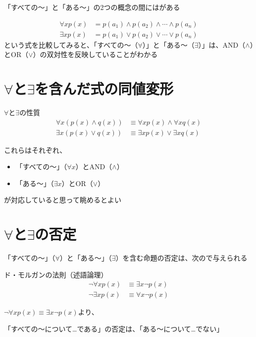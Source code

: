 \documentclass[b5paper,12pt]{jsarticle}
\begin{document}
「すべての〜」と「ある〜」の2つの概念の間にはがある

\begin{align*}
  \forall x p(x) & = p(a_1) \land p(a_2) \land \cdots \land p(a_n) \\
  \exists x p(x) & = p(a_1) \lor p(a_2) \lor \cdots \lor p(a_n)
\end{align*}
という式を比較してみると、「すべての〜（$\forall$）」と「ある〜（$\exists$）」は、AND（$\land$）とOR（$\lor$）の双対性を反映していることがわかる

\sectionline
\section{$\forall$と$\exists$を含んだ式の同値変形}

\begin{theorem}{$\forall$と$\exists$の性質}
  \begin{align*}
    \forall x (p(x) \land q(x)) & \equiv \forall x p(x) \land \forall x q(x) \\
    \exists x (p(x) \lor q(x))  & \equiv \exists x p(x) \lor \exists x q(x)
  \end{align*}
\end{theorem}

これらはそれぞれ、
\begin{itemize}
  \item 「すべての〜」（$\forall x$）とAND（$\land$）
  \item 「ある〜」（$\exists x$）とOR（$\lor$）
\end{itemize}
が対応していると思って眺めるとよい

\sectionline
\section{$\forall$と$\exists$の否定}

「すべての〜」（$\forall$）と「ある〜」（$\exists$）を含む命題の否定は、次ので与えられる

\begin{theorem}{ド・モルガンの法則（述語論理）}
  \begin{align*}
    \neg \forall x p(x) & \equiv \exists x \neg p(x) \\
    \neg \exists x p(x) & \equiv \forall x \neg p(x)
  \end{align*}
\end{theorem}

$\neg \forall x p(x) \equiv \exists x \neg p(x)$より、
\begin{shaded}
  「すべての〜について…である」の否定は、「ある〜について…でない」
\end{shaded}
\end{document}
